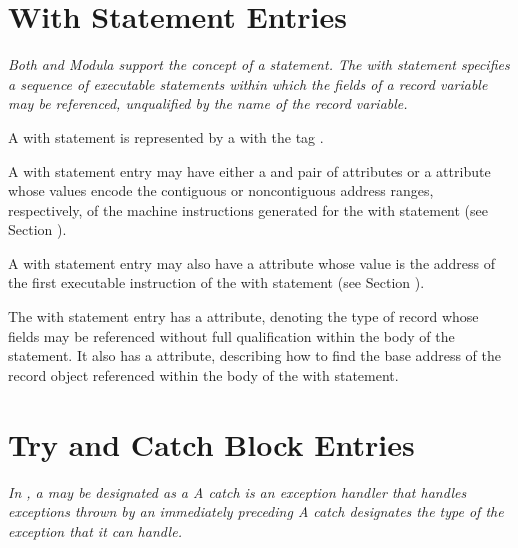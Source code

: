 \section{With Statement Entries}
\label{chap:withstatemententries}

\textit{Both  and 
Modula support the concept of a 
statement. The with statement specifies a sequence of
executable statements within which the fields of a record
variable may be referenced, unqualified by the name of the
record variable.}

A with statement is represented by a
with the tag \DWTAGwithstmtTARG.

A with statement entry may have either a 
\DWATlowpc{} and
\DWAThighpc{} pair of attributes 
or 
a \DWATranges{} attribute
whose values encode the contiguous or non\dash contiguous address
ranges, respectively, of the machine instructions generated
for the with statement 
(see Section ).

A 
\hypertarget{chap:DWATentrypcofwithstmt}{}
with statement entry may also have 
a 
\DWATentrypc{} attribute
whose value is the address of the first executable instruction
of the with statement (see 
Section ).

The with statement entry has 
a \DWATtype{} attribute, denoting
the type of record whose fields may be referenced without full
qualification within the body of the statement. It also has
a \DWATlocation{} attribute, describing how to find the base
address of the record object referenced within the body of
the with statement.

\section{Try and Catch Block Entries}
\label{chap:tryandcatchblockentries}
\textit{In , a  may be 
designated as a  
A catch  is an exception handler that 
handles exceptions thrown by an immediately preceding 
A catch  
designates the type of the exception that it can handle.}

